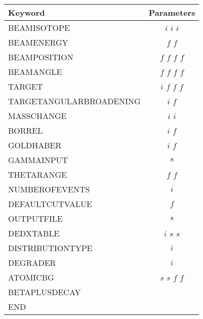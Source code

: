 \documentclass[12pt]{book}
\begin{document}
\begin{table}[ht]
  \centering
  \label{tab:EVENTGENERATORKEY}
  \begin{tabular}{|l||c|}
    \hline
    Keyword & Parameters \\
    \hline
    \hline
    BEAMISOTOPE             & $i$ $i$ $i$     \\
    BEAMENERGY              & $f$ $f$         \\
    BEAMPOSITION            & $f$ $f$ $f$ $f$ \\
    BEAMANGLE               & $f$ $f$ $f$ $f$ \\
    TARGET                  & $i$ $f$ $f$ $f$ \\
    TARGETANGULARBROADENING & $i$ $f$         \\
    MASSCHANGE              & $i$ $i$         \\
    BORREL                  & $i$ $f$         \\
    GOLDHABER               & $i$ $f$         \\
    GAMMAINPUT              & $s$             \\
    THETARANGE              & $f$ $f$         \\
    NUMBEROFEVENTS          & $i$             \\
    DEFAULTCUTVALUE         & $f$             \\
    OUTPUTFILE              & $s$             \\
    DEDXTABLE               & $i$ $s$ $s$     \\
    DISTRIBUTIONTYPE	& $i$		\\
    DEGRADER		& $i$		\\
    ATOMICBG                & $s$ $s$ $f$ $f$ \\
    BETAPLUSDECAY           &                 \\
    END                     &                 \\
    \hline
  \end{tabular}
\end{table}

\FloatBarrier
\end{document}
